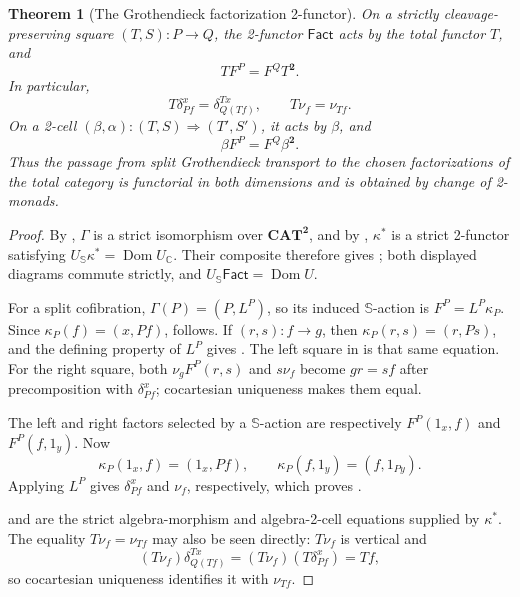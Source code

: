 \documentclass[11pt]{article}
\theoremstyle{plain}
\newtheorem{theorem}{Theorem}[section]
\theoremstyle{definition}
\theoremstyle{remark}
\newcommand{\CAT}{\mathbf{CAT}}
\newcommand{\Dom}{\operatorname{Dom}}
\newcommand{\C}{\mathbb{C}}
\newcommand{\Sq}{\mathbb{S}}
\newcommand{\Fact}{\mathsf{Fact}}
\numberwithin{equation}{section}
\begin{document}
\begin{theorem}[The Grothendieck factorization 2-functor]
On a strictly cleavage-preserving square
$(T,S)\colon P\to Q$, the 2-functor $\Fact$ acts by the total functor
$T$, and
\begin{equation}
  T F^{P}=F^{Q}T^{\mathbf 2}.
  \label{eq:Fact-on-one-cells}
\end{equation}
In particular,
\begin{equation*}
  T\delta^{x}_{Pf}=\delta^{Tx}_{Q(Tf)},
  \qquad
  T\nu_f=\nu_{Tf}.
\end{equation*}
On a 2-cell
$(\beta,\alpha)\colon(T,S)\Rightarrow(T',S')$, it acts by $\beta$,
and
\begin{equation}
  \beta F^{P}=F^{Q}\beta^{\mathbf 2}.
  \label{eq:Fact-on-two-cells}
\end{equation}
Thus the passage from split Grothendieck transport to the chosen
factorizations of the total category is functorial in both
dimensions and is obtained by change of 2-monads.
\end{theorem}

\begin{proof}
By , $\Gamma$ is a strict isomorphism over
$\CAT^{\mathbf 2}$, and by
, $\kappa^{*}$ is a strict
2-functor satisfying $U_{\Sq}\kappa^{*}=\Dom U_{\C}$.  Their composite
therefore gives ; both displayed diagrams
commute strictly, and $U_{\Sq}\Fact=\Dom U$.

For a split cofibration, $\Gamma(P)=(P,L^{P})$, so its induced
$\Sq$-action is $F^{P}=L^{P}\kappa_P$.  Since
$\kappa_P(f)=(x,Pf)$,  follows.  If
$(r,s)\colon f\to g$, then $\kappa_P(r,s)=(r,Ps)$, and the defining
property of $L^{P}$ gives .  The left square
in  is that same equation.
For the right square, both $\nu_gF^{P}(r,s)$ and $s\nu_f$ become
$gr=sf$ after precomposition with $\delta^{x}_{Pf}$; cocartesian
uniqueness makes them equal.

The left and right factors selected by a $\Sq$-action are respectively
$F^{P}(1_x,f)$ and $F^{P}(f,1_y)$.  Now
\begin{equation*}
  \kappa_P(1_x,f)=(1_x,Pf),
  \qquad
  \kappa_P(f,1_y)=(f,1_{Py}).
\end{equation*}
Applying $L^{P}$ gives $\delta^{x}_{Pf}$ and $\nu_f$, respectively,
which proves .

 and
 are the strict algebra-morphism and
algebra-2-cell equations supplied by $\kappa^{*}$.  The equality
$T\nu_f=\nu_{Tf}$ may also be seen directly: $T\nu_f$ is vertical and
\begin{equation*}
  (T\nu_f)\delta^{Tx}_{Q(Tf)}
  =(T\nu_f)(T\delta^{x}_{Pf})=Tf,
\end{equation*}
so cocartesian uniqueness identifies it with $\nu_{Tf}$.
\end{proof}
\end{document}
